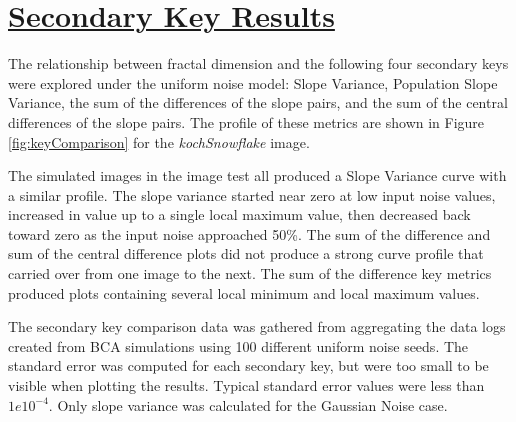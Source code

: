 \documentclass[12pt, oneside]{book}
\begin{document}
% 
%
\section{\underline{Secondary Key Results}}
The relationship between fractal dimension and the following four secondary keys were explored under the uniform noise model: Slope Variance, Population Slope Variance, the sum of the differences of the slope pairs, and the sum of the central differences of the slope pairs.  The profile of these metrics are shown in Figure \ref{fig:keyComparison} for the \textit{kochSnowflake} image.  

The simulated images in the image test all produced a Slope Variance curve with a similar profile.  The slope variance started near zero at low input noise values, increased in value up to a single local maximum value, then decreased back toward zero as the input noise approached 50\%.  The sum of the difference and sum of the central difference plots did not produce a strong curve profile that carried over from one image to the next.  The sum of the difference key metrics produced plots containing several local minimum and local maximum values.

The secondary key comparison data was gathered from aggregating the data logs created from BCA simulations using 100 different uniform noise seeds.  The standard error was computed for each secondary key, but were too small to be visible when plotting the results.  Typical standard error values were less than \(1e10^{-4}\). Only slope variance was calculated for the Gaussian Noise case.
\end{document}
